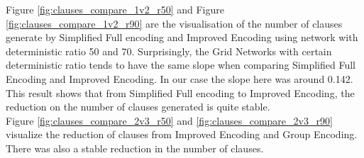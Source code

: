 \noindent Figure \ref{fig:clauses_compare_1v2_r50} and Figure \ref{fig:clauses_compare_1v2_r90} are the visualisation of the number of clauses generate by Simplified Full encoding and Improved Encoding using network with deterministic ratio 50 and 70. Surprisingly, the Grid Networks with certain deterministic ratio tends to have the same slope when comparing Simplified Full Encoding and Improved Encoding. In our case the slope here was around 0.142. This result shows that from Simplified Full encoding to Improved Encoding, the reduction on the number of clauses generated is quite stable.\\

\noindent Figure \ref{fig:clauses_compare_2v3_r50} and  \ref{fig:clauses_compare_2v3_r90} visualize the reduction of clauses from Improved Encoding and Group Encoding. There was also a stable reduction in the number of clauses.


